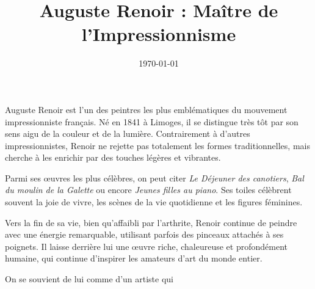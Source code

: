 \documentclass{article}
\title{Auguste Renoir : Maître de l’Impressionnisme}
\author{}
\date{\today}
\begin{document}
\maketitle

Auguste Renoir est l’un des peintres les plus emblématiques du mouvement impressionniste français. Né en 1841 à Limoges, il se distingue très tôt par son sens aigu de la couleur et de la lumière. Contrairement à d'autres impressionnistes, Renoir ne rejette pas totalement les formes traditionnelles, mais cherche à les enrichir par des touches légères et vibrantes. 

Parmi ses œuvres les plus célèbres, on peut citer \emph{Le Déjeuner des canotiers}, \emph{Bal du moulin de la Galette} ou encore \emph{Jeunes filles au piano}. Ses toiles célèbrent souvent la joie de vivre, les scènes de la vie quotidienne et les figures féminines.

Vers la fin de sa vie, bien qu'affaibli par l'arthrite, Renoir continue de peindre avec une énergie remarquable, utilisant parfois des pinceaux attachés à ses poignets. Il laisse derrière lui une œuvre riche, chaleureuse et profondément humaine, qui continue d’inspirer les amateurs d’art du monde entier.

On se souvient de lui comme d'un artiste qui 
\end{document}
